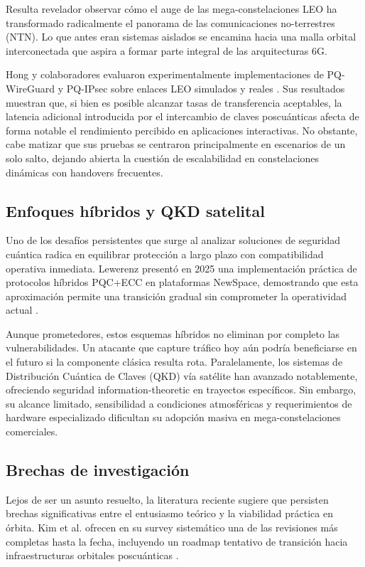 Resulta revelador observar cómo el auge de las mega-constelaciones LEO ha transformado radicalmente el panorama de las comunicaciones no-terrestres (NTN). Lo que antes eran sistemas aislados se encamina hacia una malla orbital interconectada que aspira a formar parte integral de las arquitecturas 6G.

Hong y colaboradores evaluaron experimentalmente implementaciones de PQ-WireGuard y PQ-IPsec sobre enlaces LEO simulados y reales \cite{Hong2026}. Sus resultados muestran que, si bien es posible alcanzar tasas de transferencia aceptables, la latencia adicional introducida por el intercambio de claves poscuánticas afecta de forma notable el rendimiento percibido en aplicaciones interactivas. No obstante, cabe matizar que sus pruebas se centraron principalmente en escenarios de un solo salto, dejando abierta la cuestión de escalabilidad en constelaciones dinámicas con handovers frecuentes.

\subsection{Enfoques híbridos y QKD satelital}

Uno de los desafíos persistentes que surge al analizar soluciones de seguridad cuántica radica en equilibrar protección a largo plazo con compatibilidad operativa inmediata. Lewerenz presentó en 2025 una implementación práctica de protocolos híbridos PQC+ECC en plataformas NewSpace, demostrando que esta aproximación permite una transición gradual sin comprometer la operatividad actual \cite{Lewerenz2025}. 

Aunque prometedores, estos esquemas híbridos no eliminan por completo las vulnerabilidades. Un atacante que capture tráfico hoy aún podría beneficiarse en el futuro si la componente clásica resulta rota. Paralelamente, los sistemas de Distribución Cuántica de Claves (QKD) vía satélite han avanzado notablemente, ofreciendo seguridad information-theoretic en trayectos específicos. Sin embargo, su alcance limitado, sensibilidad a condiciones atmosféricas y requerimientos de hardware especializado dificultan su adopción masiva en mega-constelaciones comerciales.

\subsection{Brechas de investigación}

Lejos de ser un asunto resuelto, la literatura reciente sugiere que persisten brechas significativas entre el entusiasmo teórico y la viabilidad práctica en órbita. Kim et al. ofrecen en su survey sistemático una de las revisiones más completas hasta la fecha, incluyendo un roadmap tentativo de transición hacia infraestructuras orbitales poscuánticas \cite{Kim2026}. 

